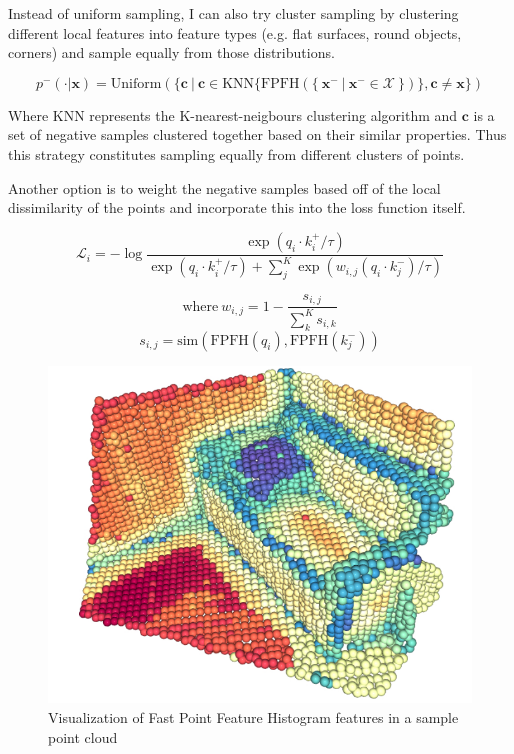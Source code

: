 \documentclass[12pt]{article}
\begin{document}
Instead of uniform sampling, I can also try cluster sampling by clustering different local features into feature types (e.g. flat surfaces, round objects, corners) and sample equally from those distributions.

$$p^{-}( \cdot | \mathbf{x}) = \text{Uniform}(\{ \textbf{c} \: | \: \textbf{c} \in \text{KNN}\{ \text{FPFH} ( \{ \: \textbf{x}^- \: | \: \textbf{x}^- \in \mathcal{X} \: \} ) \}, \textbf{c} \neq \textbf{x} \})$$

Where $\text{KNN}$ represents the K-nearest-neigbours clustering algorithm and $\textbf{c}$ is a set of negative samples clustered together based on their similar properties. Thus this strategy constitutes sampling equally from different clusters of points.
%

Another option is to weight the negative samples based off of the local dissimilarity of the points and incorporate this into the loss function itself.
%

$$\mathcal{L}_{i} = -\log \frac{\exp(q_{i} \cdot k^{+}_{i} / \tau)}{\exp(q_{i} \cdot k^{+}_{i} / \tau) + \sum^{K}_{j}\exp(w_{i,j} (q_{i} \cdot k^{-}_{j}) / \tau)}$$

$$\text{where} \: w_{i,j} = 1 - \frac{s_{i,j}}{\sum_k^{K}s_{i,k}} $$
$$ s_{i,j} = \text{sim}(\text{FPFH}(q_{i}), \text{FPFH}(k^{-}_{j}))$$

\begin{figure}[h!]
    \begin{center}
        \includegraphics[scale=0.5]{images/fpfh.png}
        \caption{Visualization of Fast Point Feature Histogram features in a sample point cloud}
    \end{center}
\end{figure}
\end{document}
